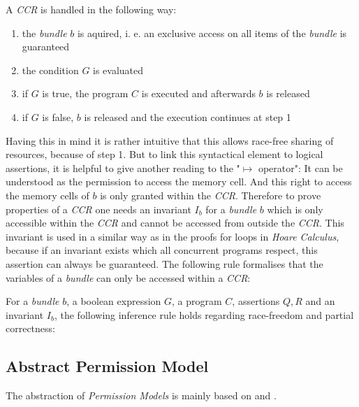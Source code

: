 	A \emph{CCR} is handled in the following way:
	\begin{enumerate}
		\item the \emph{bundle} $b$ is aquired, i. e. an exclusive access
			on all items of the \emph{bundle} is guaranteed
		\item the condition $G$ is evaluated
		\item if $G$ is true, the program $C$ is executed and afterwards $b$ is
			released
		\item if $G$ is false, $b$ is released and the execution continues at step 1
	\end{enumerate}
	Having this in mind it is rather intuitive that this allows race-free sharing
	of resources, because of step 1. But to link this syntactical element to
	logical assertions, it is helpful to give another reading to the
	"$\mapsto$ operator": It can be understood as the permission to access the
	memory cell.
	And this right to access the memory cells of $b$ is only granted within the
	\emph{CCR}. Therefore to prove properties of a \emph{CCR} one needs an
	invariant $I_b$ for a \emph{bundle} $b$ which is only accessible within the
	\emph{CCR} and cannot be accessed from outside the \emph{CCR}. This invariant
	is used in a similar way as in the proofs for loops in \emph{Hoare Calculus},
	because if an invariant exists which all concurrent programs respect, this
	assertion can always be guaranteed. The following rule formalises that the
	variables of a \emph{bundle} can only be accessed within a \emph{CCR}:
	
	\begin{mydef}
		For a \emph{bundle} $b$, a boolean expression $G$, a program $C$,
		assertions $Q, R$ and an invariant $I_b$, the following inference rule
		holds regarding race-freedom and partial correctness:
	\begin{prooftree}
	\end{prooftree}
	\end{mydef}

\subsection{Abstract Permission Model}
	The abstraction of \emph{Permission Models} is mainly based on
	\cite{freshlook} and \cite{PermAcc}.

